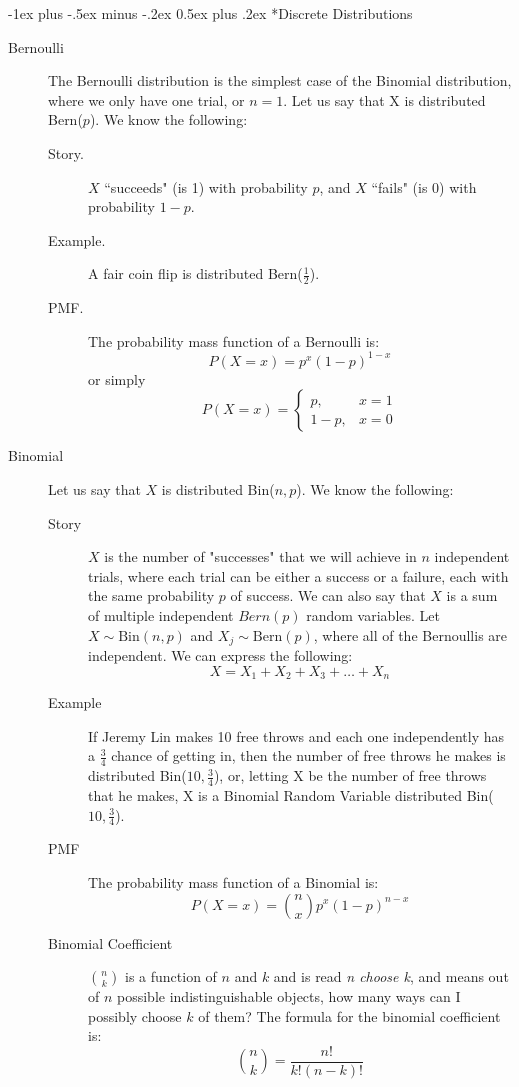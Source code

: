 \documentclass[10pt,landscape]{article}
\makeatletter
\theoremstyle{definition}
\newcommand{\Bern}{\textrm{Bern}}
\newcommand{\Bin}{\textrm{Bin}}
\renewcommand{\section}{\@startsection{section}{1}{0mm}%
                                {-1ex plus -.5ex minus -.2ex}%
                                {0.5ex plus .2ex}%
                                {\normalfont\large\bfseries}}
\makeatother
\begin{document}
\begin{multicols}{3}
\section*{Discrete Distributions}

\begin{description}
\item[Bernoulli] The Bernoulli distribution is the simplest case of the Binomial distribution, where we only have one trial, or $n=1$. Let us say that X is distributed \Bern($p$). We know the following:
\begin{description}
    \item[Story.] $X$ ``succeeds" (is 1) with probability $p$, and $X$ ``fails" (is 0) with probability $1-p$.
    \item[Example.] A fair coin flip is distributed \Bern($\frac{1}{2}$).
    \item[PMF.] The probability mass function of a Bernoulli is:
\[P(X = x) = p^x(1-p)^{1-x}\]
or simply
\[P(X = x) = \begin{cases} p, & x = 1 \\ 1-p, & x = 0 \end{cases}\]
\end{description}

\item[Binomial] Let us say that $X$ is distributed \Bin($n,p$). We know the following:
\begin{description}
    \item[Story] $X$ is the number of "successes" that we will achieve in $n$ independent trials, where each trial can be either a success or a failure, each with the same probability $p$ of success. We can also say that $X$ is a sum of multiple independent $Bern(p)$ random variables. Let $X \sim \Bin(n, p)$ and $X_j \sim \Bern(p)$, where all of the Bernoullis are independent. We can express the following:
    \[X = X_1 + X_2 + X_3 + \dots + X_n\]
    \item[Example] If Jeremy Lin makes 10 free throws and each one independently has a $\frac{3}{4}$ chance of getting in, then the number of free throws he makes is distributed  \Bin($10,\frac{3}{4}$), or, letting X be the number of free throws that he makes, X is a Binomial Random Variable distributed  \Bin($10,\frac{3}{4}$).
    \item[PMF] The probability mass function of a Binomial is:
\[P(X = x) = {n  \choose x} p^x(1-p)^{n-x}\]
    \item[Binomial Coefficient] ${n  \choose k}$ is a function of $n$ and $k$ and is read \emph{n choose k}, and means out of $n$ possible indistinguishable objects, how many ways can I possibly choose $k$ of them? The formula for the binomial coefficient is:
\[{n  \choose k} = \frac{n!}{k!(n-k)!}\]
\end{description}



\end{description}
\end{multicols}
\end{document}
